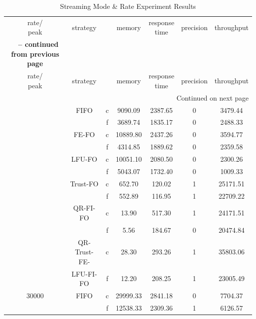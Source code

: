 \begin{center}
	\begin{longtable}{|c||c||c|c|c|c|c|}
	\caption[Streaming Mode \& Rate Experiment Results]{Streaming Mode \& Rate Experiment Results} \label{tab:6-smri} \\
	\hline \makecell{rate/ \\ peak} & strategy & \makecell{mode} & memory & \makecell{response \\time} & precision & throughput \\ \hhline{|=#=#=|=|=|=|=|}
	\endfirsthead
	\multicolumn{7}{c} {{\bfseries \tablename\ \thetable{} -- continued from previous page}} \\
	\hline \makecell{rate/ \\ peak} & strategy & \makecell{mode} & memory & \makecell{response \\time} & precision & throughput \\ \hline 
	\endhead
	\hline \multicolumn{7}{|r|}{{Continued on next page}} \\ \hline
	\endfoot
	\hline
	\endlastfoot
	10000 & FIFO & c  & 9090.09 & 2387.65 & 0 & 3479.44 \\ \cline{3-7}
	      &      & f  & 3689.74 & 1835.17 & 0 & 2488.33 \\ \cline{2-7}
	      & FE-FO & c & 10889.80 & 2437.26 & 0 & 3594.77\\ \cline{3-7}
	      &       & f & 4314.85  & 1889.62 & 0 & 2359.58\\ \cline{2-7}
	      & LFU-FO & c & 10051.10 & 2080.50 & 0 & 2300.26 \\ \cline{3-7}
	      &        & f & 5043.07  & 1732.40 & 0 & 1009.33\\  \cline{2-7}
	      & Trust-FO & c & 652.70 & 120.02 & 1 & 25171.51\\  \cline{3-7}
	      &          & f & 552.89 & 116.95 & 1 & 22709.22\\  \cline{2-7}
	      & QR-FI-FO & c & 13.90 & 517.30 & 1 & 24171.51\\ \cline{3-7}
	      &          & f & 5.56  & 184.67 & 0 & 20474.84\\  \cline{2-7}
	      & QR-Trust-FE- & c & 28.30 & 293.26 & 1 & 35803.06\\  \cline{3-7}
	      & LFU-FI-FO    & f & 12.20 & 208.25 & 1 & 23005.49\\ \hhline{|=#=#=|=|=|=|=|}
	30000 & FIFO & c & 29999.33 & 2841.18 & 0 & 7704.37 \\     \cline{3-7}
	      &      & f & 12538.33 & 2309.36 & 1 & 6126.57 \\ \cline{2-7}

\end{longtable}
\end{center}
